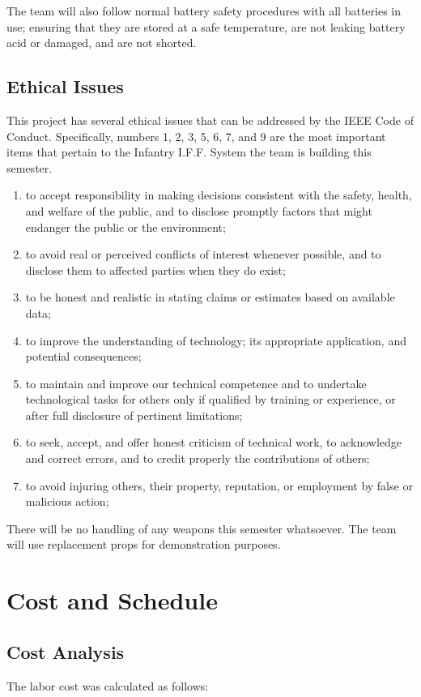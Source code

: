 \documentclass[letterpaper,10pt]{article}
\makeatletter
\newcommand{\skipitems}[1]{%
	\addtocounter{\@enumctr}{#1}%
}
\makeatother
\begin{document}
\begin{spacing}{1.15}
The team will also follow normal battery safety procedures with all batteries in use; ensuring that they are stored at a safe temperature, are not leaking battery acid or damaged, and are not shorted. 


\subsection{Ethical Issues}
This project has several ethical issues that can be addressed by the IEEE Code of Conduct. Specifically, numbers 1, 2, 3, 5, 6, 7, and 9 are the most important items that pertain to the Infantry I.F.F. System the team is building this semester. 
\begin{enumerate}
\item to accept responsibility in making decisions consistent with the safety, health, and welfare of the public, and to disclose promptly factors that might endanger the public or the environment;
\item to avoid real or perceived conflicts of interest whenever possible, and to disclose them to affected parties when they do exist;
\item to be honest and realistic in stating claims or estimates based on available data;  
\skipitems{1}
\item to improve the understanding of technology; its appropriate application, and potential consequences;  
\item to maintain and improve our technical competence and to undertake technological tasks for others only if qualified by training or experience, or after full disclosure of pertinent limitations;  
\item to seek, accept, and offer honest criticism of technical work, to acknowledge and correct errors, and to credit properly the contributions of others;  
\skipitems{1}
\item to avoid injuring others, their property, reputation, or employment by false or malicious action;  
\end{enumerate}

There will be no handling of any weapons this semester whatsoever. The team will use replacement props for demonstration purposes.

\section{Cost and Schedule}

\subsection{Cost Analysis}
The labor cost was calculated as follows:


\end{spacing}
\end{document}
